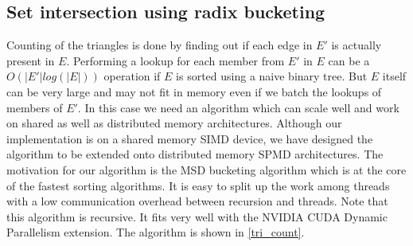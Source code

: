 \documentclass[conference]{IEEEtran}
\begin{document}






\subsection{Set intersection using radix bucketing}
Counting of the triangles is done by finding out if each edge in $E'$ is actually present in $E$. Performing a lookup for each member from $E'$ in $E$ can be a $O(|E'|log(|E|))$ operation if $E$ is sorted using a naive binary tree. But $E$ itself can be very large and may not fit in memory even if we batch the lookups of members of $E'$. In this case we need an algorithm which can scale well and work on shared as well as distributed memory architectures. Although our implementation is on a shared memory SIMD device, we have designed the algorithm to be extended onto distributed memory SPMD architectures. The motivation for our algorithm is the MSD bucketing algorithm which is at the core of the fastest sorting algorithms\cite{b14}. It is easy to split up the work among threads with a low communication overhead between recursion and threads. Note that this algorithm is recursive. It fits very well with the NVIDIA CUDA Dynamic Parallelism extension\cite{b21}. The algorithm is shown in \ref{tri_count}.
\end{document}
